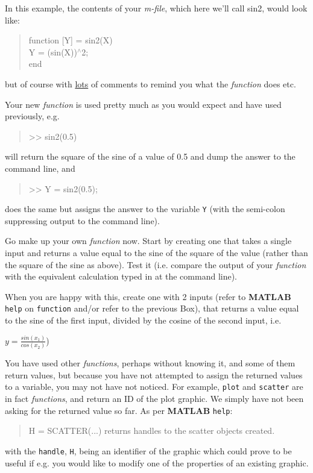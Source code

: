 \documentclass{tufte-book} %
\newenvironment{docspec}{\begin{quotation}\ttfamily\parskip0pt\parindent0pt\ignorespaces}{\end{quotation}}
\begin{document}
In this example, the contents of your \textit{m-file}, which here we'll call \textsf{sin2}, would look like:
\begin{docspec}
function [Y] = sin2(X)
\\Y = (sin(X))\(^{\wedge}\)2; 
\\end
\end{docspec}
\noindent but of course with \uline{lots} of comments to remind you what the \textit{function} does etc.

Your new \textit{function} is used pretty much as you would expect and have used previously, e.g.
\begin{docspec}
>> sin2(0.5)
\end{docspec}
\noindent will return the square of the sine of a value of 0.5 and dump the answer to the command line, and 
\begin{docspec}
>> Y = sin2(0.5);
\end{docspec}
\noindent does the same but assigns the answer to the variable \texttt{Y} (with the semi-colon suppressing output to the command line).

Go make up your own \textit{function} now. Start by creating one that takes a single input and returns a value equal to the sine of the square of the value (rather than the square of the sine as above). Test it (i.e. compare the output of your \textit{function} with the equivalent calculation typed in at the command line).

When you are happy with this, create one with 2 inputs (refer to \textbf{MATLAB} \texttt{help} on \texttt{function} and/or refer to the previous Box), that returns a value equal to the sine of the first input, divided by the cosine of the second input, i.e.

\vspace{2mm}
\(y = \frac{sin(x_1)}{cos(x_2)}\))
\vspace{2mm}

You have used other \textit{functions}, perhaps without knowing it, and some of them return values, but because you have not attempted to assign the returned values to a variable, you may not have not noticed. For example, \texttt{plot} and \texttt{scatter} are in fact \textit{functions}, and return an ID of the plot graphic. We simply have not been asking for the returned value so far. As per \textbf{MATLAB} \texttt{help}:
\begin{docspec}
H = SCATTER(...) returns handles to the scatter objects created.
\end{docspec}
with the \texttt{handle}, \texttt{H}, being an identifier of the graphic which could prove to be useful if  e.g. you would like to modify  one of the properties of an existing graphic.
\end{document}
